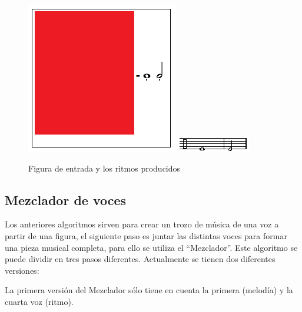 \begin{itemize}
		\begin{figure}[htbp]
		\centering
		\hspace*{0.0in}
		\includegraphics[scale=1]{graphics/simpletest2-F2F3_3.png}
		\includegraphics[scale=1]{graphics/simpletest2-PERpartitura.png}
		\caption{Figura de entrada y los ritmos producidos}
		\label{fig:Figura4Voz4}
		\end{figure}

\end{itemize}


\subsection{Mezclador de voces}

Los anteriores algoritmos sirven para crear un trozo de música de una voz a partir de una figura, el siguiente paso es juntar las distintas voces para formar una pieza musical completa, para ello se utiliza el ``Mezclador''. 
Este algoritmo se puede dividir en tres pasos diferentes. Actualmente se tienen dos diferentes versiones:

La primera versión del Mezclador sólo tiene en cuenta la primera (melodía) y la cuarta voz (ritmo).

